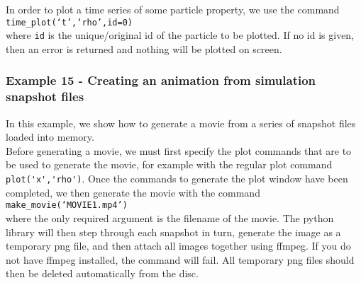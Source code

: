 \documentclass[a4paper]{article}
\newcommand{\var}[1]{\texttt{#1}}
\newcommand{\singlecommand}[1]{\\ \newline \indent \var{#1} \\ \newline \noindent}
\begin{document}




\noindent In order to plot a time series of some particle property, we use the command \singlecommand{time\_plot(`t',`rho',id=0)} where \var{id} is the unique/original id of the particle to be plotted.  If no id is given, then an error is returned and nothing will be plotted on screen.







\subsubsection{Example  15 - Creating an animation from simulation snapshot files}
In this example, we show how to generate a movie from a series of snapshot files loaded into memory. \\








\noindent Before generating a movie, we must first specify the plot commands that are to be used to generate the movie, for example with the regular plot command \lstinline{plot('x','rho')}.  Once the commands to generate the plot window have been completed, we then generate the movie with the command \singlecommand{make\_movie(`MOVIE1.mp4')} where the only required argument is the filename of the movie.  The python library will then step through each snapshot in turn, generate the image as a temporary png file, and then attach all images together using ffmpeg.  If you do not have ffmpeg installed, the command will fail. All temporary png files should then be deleted automatically from the disc.
\end{document}
